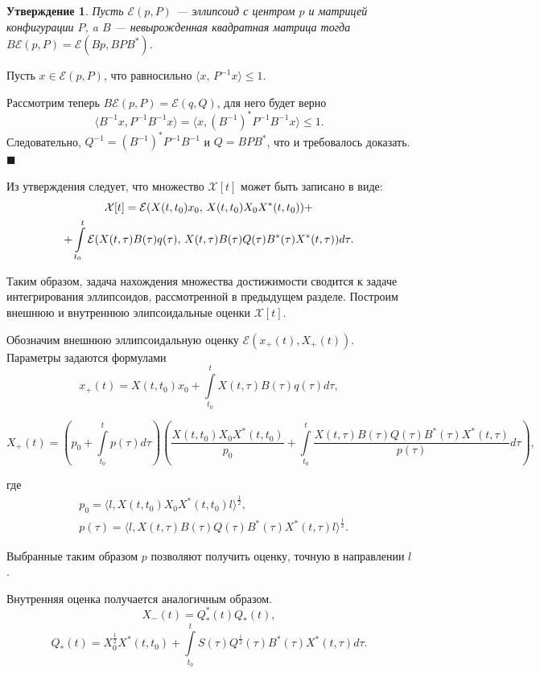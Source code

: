 \documentclass[16pt]{article}
\newtheorem{St}{Утверждение}
\newenvironment{Proof}{\par\noindent{\bf Доказательство. \\}}{\hfill$\scriptstyle\blacksquare$}
\newcommand\Scal[2]{\langle #1,\, #2 \rangle}
\newcommand\Int[2]{\int\limits_{#1}^{#2}}
\begin{document}
\begin{St}
Пусть $\mathcal{E}(p, P)$ --- эллипсоид с центром $p$ и матрицей конфигурации $P$, a $B$ --- невырожденная квадратная матрица тогда $B\mathcal{E}(p, P) = \mathcal{E}(Bp, BPB^*)$.
\end{St}
\begin{Proof}
Пусть $x \in \mathcal{E}(p, P)$, что равносильно $\Scal{x}{P^{-1}x}  \leq 1$.

Рассмотрим теперь $B\mathcal{E}(p, P) = \mathcal{E}(q, Q)$, для него будет верно 
$$\langle B^{-1}x, P^{-1}B^{-1}x\rangle = \langle x, \left(B^{-1}\right)^* P^{-1} B^{-1}x \rangle \leqslant 1.$$
Следовательно, $Q^{-1} = \left(B^{-1}\right)^* P^{-1} B^{-1}$ и $Q = B P B^*$, что и требовалось доказать.
\end{Proof}


Из утверждения следует, что множество $\mathcal{X}[t]$ может быть записано в виде:
\begin{multline}\notag
\mathcal{X}[t] = \mathcal{E}(X(t, t_0)x_0,\, X(t, t_0)X_0 X^*(t, t_0)) + \\+\int\limits_{t_0}^{t} \mathcal{E}(X(t, \tau)B(\tau) q(\tau),\, X(t, \tau) B(\tau) Q(\tau) B^*(\tau) X^*(t, \tau))d\tau.
\end{multline}

Таким образом, задача нахождения множества достижимости сводится к задаче интегрирования эллипсоидов, рассмотренной в предыдущем разделе. Построим внешнюю и внутреннюю элипсоидальные оценки $\mathcal{X}[t]$.


Обозначим внешнюю эллипсоидальную оценку $\mathcal{E}(x_{+}(t), X_{+}(t))$. Параметры задаются формулами
$$
x_+(t) = X(t, t_0)x_0 + \Int{t_0}{t}X(t, \tau)B(\tau)q(\tau)d\tau,
$$

$$
X_{+}(t) = \left( p_0 + \int\limits_{t_0}^{t} p(\tau)d\tau\right)\left(\dfrac{X(t, t_0)X_0 X^*(t, t_0)}{p_0} + \int\limits_{t_0}^{t} \dfrac{X(t, \tau)B(\tau)Q(\tau) B^*(\tau) X^*(t, \tau)}{p(\tau)}d\tau\right),
$$ 

где 
$$
\begin{aligned} 
&p_0 = \langle l, X(t, t_0)X_0 X^*(t, t_0)l \rangle^{\frac{1}{2}},\\
&p(\tau) =\langle l, X(t, \tau) B(\tau) Q(\tau) B^*(\tau) X^*(t, \tau) l\rangle^{\frac{1}{2}}.
\end{aligned}
$$

Выбранные таким образом $p$ позволяют получить оценку, точную в направлении $l$.

Внутренняя оценка получается аналогичным образом.
$${X}_-(t) = Q_*^*(t)Q_*(t),$$
$$Q_*(t) = X_0^\frac12X^*(t, t_0) + \Int{t_0}{t}S(\tau)Q^{\frac12}(\tau)B^*(\tau)X^*(t, \tau)d\tau.$$
\end{document}
